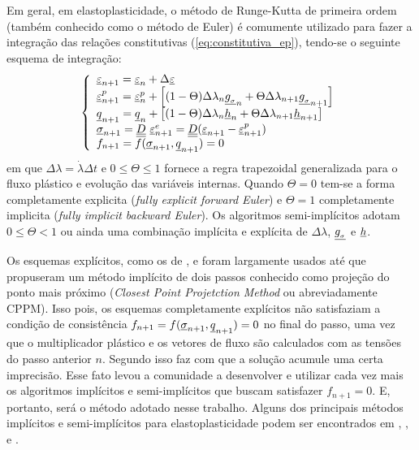 Em geral, em elastoplasticidade, o método de Runge-Kutta de primeira ordem (também conhecido como o método de Euler) é comumente utilizado para fazer a integração das relações constitutivas (\ref{eq:constitutiva_ep}), tendo-se o seguinte esquema de integração:
\begin{equation}
	\label{eq:esquema_int_constitutiva_ep}
	\left\{
	\begin{array}{lcl}
		\underline{\varepsilon}_{n+1} = \underline{\varepsilon}_n + \Delta \underline{\varepsilon} \\
		\underline{\varepsilon}_{n+1}^p = \underline{\varepsilon}_n^p + \left[(1-\Theta) \Delta \lambda_n \underline{g_{_\sigma}}_n + \Theta \Delta \lambda_{n+1} \underline{g_{_\sigma}}_{n+1}\right] \\
		\underline q_{n+1} = \underline q_n + \left[(1-\Theta) \Delta \lambda_n \underline h_n + \Theta \Delta \lambda_{n+1} \underline h_{n+1}\right] \\	
		\underline \sigma_{n+1} = \underline{\underline D}~\underline{\varepsilon}_{n+1}^e = \underline{\underline D}( \underline{\varepsilon}_{n+1} - \underline{\varepsilon}_{n+1}^p) \\
		f_{n+1} = f(\underline \sigma_{n+1},\underline q_{n+1}) = 0		
	\end{array}
	\right.
\end{equation}
em que $\Delta \lambda = \dot\lambda\Delta t$ e $0 \leq \Theta \leq 1$ fornece a regra trapezoidal generalizada para o fluxo plástico e evolução das variáveis internas. Quando $\Theta = 0$ tem-se a forma completamente explicita (\textit{fully explicit forward Euler}) e $\Theta = 1$  completamente implicita (\textit{fully implicit backward Euler}). Os algoritmos semi-implícitos adotam $0 \leq \Theta < 1$  ou ainda uma combinação implícita e explícita de $\Delta \lambda$, $\underline{g_{_\sigma}}$ e $\underline h$.

Os esquemas explícitos, como os de ,  e  foram largamente usados até que  propuseram um método implícito de dois passos conhecido como projeção do ponto mais próximo (\textit{Closest Point Projetction Method} ou abreviadamente CPPM). Isso pois, os esquemas completamente explícitos não satisfaziam a condição de consistência $f_{n+1} = f(\underline \sigma_{n+1},\underline q_{n+1}) = 0$ no final do passo, uma vez que o multiplicador plástico e os vetores de fluxo são calculados com as tensões do passo anterior $n$. Segundo  isso faz com que a solução acumule uma certa imprecisão. Esse fato levou a comunidade a desenvolver e utilizar cada vez mais os algoritmos implícitos e semi-implícitos que buscam satisfazer $f_{n+1} = 0$. E, portanto, será o método adotado nesse trabalho. Alguns dos principais métodos implícitos e semi-implícitos para elastoplasticidade podem ser encontrados em , ,  e .

